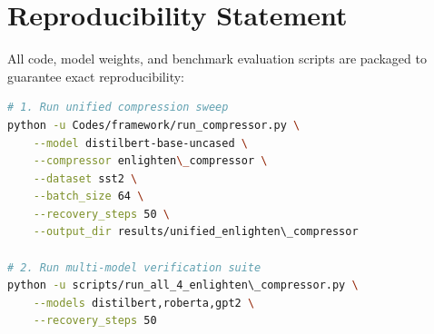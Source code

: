 \section{Reproducibility Statement}
All code, model weights, and benchmark evaluation scripts are packaged to guarantee exact reproducibility:
\begin{lstlisting}[language=bash]
# 1. Run unified compression sweep
python -u Codes/framework/run_compressor.py \
    --model distilbert-base-uncased \
    --compressor enlighten\_compressor \
    --dataset sst2 \
    --batch_size 64 \
    --recovery_steps 50 \
    --output_dir results/unified_enlighten\_compressor

# 2. Run multi-model verification suite
python -u scripts/run_all_4_enlighten\_compressor.py \
    --models distilbert,roberta,gpt2 \
    --recovery_steps 50
\end{lstlisting}
